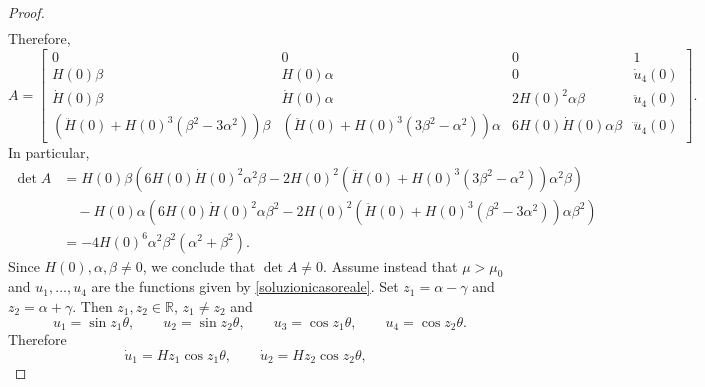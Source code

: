 \documentclass[11pt]{amsart}
\newcommand{\rr}{{\mathbb{R}}}
\theoremstyle{definition}
\theoremstyle{remark}
\numberwithin{equation}{section}
\begin{document}
\begin{proof}
\begin{align*}
\end{align*}
Therefore, 
\begin{equation*}
A=\begin{bmatrix}
	0 & 0 & 0 & 1 \\
	H(0)\beta & H(0)\alpha & 0 & \dot u_4(0) \\
	\dot H(0)\beta & \dot H(0)\alpha & 2H(0)^2\alpha\beta & \ddot u_4(0) \\
	\left(\ddot H(0)+H(0)^3\left(\beta^2-3\alpha^2\right)\right)\beta & \left(\ddot H(0)+H(0)^3\left(3\beta^2-\alpha^2\right)\right)\alpha & 6H(0)\dot H(0)\alpha\beta & \dddot u_4(0)
\end{bmatrix}.
\end{equation*}
In particular,
\begin{equation*}
\begin{split}
	\det A&=H(0)\beta\left(6H(0)\dot H(0)^2\alpha^2\beta-2H(0)^2\left(\ddot H(0)+H(0)^3\left(3\beta^2-\alpha^2\right)\right)\alpha^2\beta\right)\\
	&\quad-H(0)\alpha\left(6H(0)\dot H(0)^2\alpha\beta^2-2H(0)^2\left(\ddot H(0)+H(0)^3\left(\beta^2-3\alpha^2\right)\right)\alpha\beta^2\right)\\
	&=-4H(0)^6\alpha^2\beta^2\left(\alpha^2+\beta^2\right).
\end{split}
\end{equation*}
Since $H(0),\alpha,\beta\neq 0$, we conclude that $\det A\neq 0$.
Assume instead that $\mu>\mu_0$ and $u_1,\ldots,u_4$ are the functions given by \eqref{soluzionicasoreale}. 
Set $z_1=\alpha-\gamma$ and $z_2=\alpha+\gamma$. %
Then $z_1,z_2\in\rr$, $z_1\neq z_2$ and
\begin{equation*}
u_1=\sin z_1 \theta,\qquad
u_2=\sin z_2\theta,\qquad
u_3= \cos z_1 \theta,\qquad
u_4=\cos z_2\theta.
\end{equation*}
Therefore
\begin{equation*}
\dot u_1=Hz_1\cos z_1 \theta,\qquad
\dot u_2=Hz_2\cos z_2\theta,\qquad

\end{equation*}
\end{proof}
\end{document}
